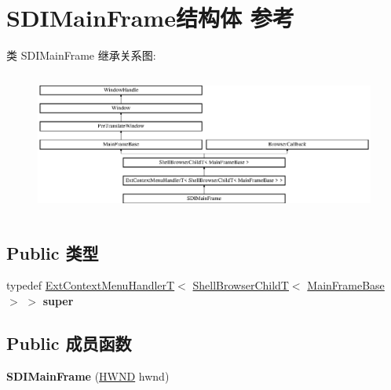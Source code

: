 \hypertarget{struct_s_d_i_main_frame}{}\section{S\+D\+I\+Main\+Frame结构体 参考}
\label{struct_s_d_i_main_frame}
类 S\+D\+I\+Main\+Frame 继承关系图\+:\begin{figure}[H]
\begin{center}
\leavevmode
\includegraphics[height=4.734299cm]{struct_s_d_i_main_frame}
\end{center}
\end{figure}
\subsection*{Public 类型}
\begin{DoxyCompactItemize}
\item 
\mbox{\label{struct_s_d_i_main_frame_aada68be73076f76d129bf9b6f1ab479e}} 
typedef \hyperlink{struct_ext_context_menu_handler_t}{Ext\+Context\+Menu\+HandlerT}$<$ \hyperlink{struct_shell_browser_child_t}{Shell\+Browser\+ChildT}$<$ \hyperlink{struct_main_frame_base}{Main\+Frame\+Base} $>$ $>$ {\bfseries super}
\end{DoxyCompactItemize}
\subsection*{Public 成员函数}
\begin{DoxyCompactItemize}
\item 
\mbox{\label{struct_s_d_i_main_frame_af78116591634443c1d641c1b99121279}} 
{\bfseries S\+D\+I\+Main\+Frame} (\hyperlink{interfacevoid}{H\+W\+ND} hwnd)
\end{DoxyCompactItemize}
